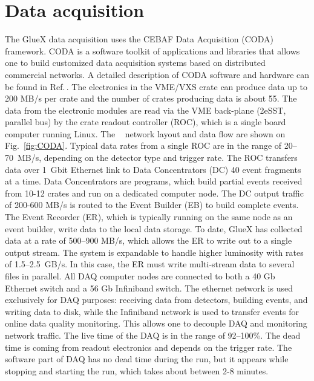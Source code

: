 
\section[Data Acquisition]{Data acquisition \label{sec:daq}}



The GlueX data acquisition uses the CEBAF Data Acquisition (CODA) framework. CODA is a software toolkit of applications and libraries that allows one to build customized data acquisition systems based on distributed commercial networks. A detailed description of CODA software and hardware can be found in Ref.\,\cite{CLAS12DAQ}. 
The electronics in the VME/VXS crate can produce data up to 200 MB/s per crate and the
number of crates producing data is about 55.
The data from the electronic modules are read via the VME back-plane (2eSST, parallel bus) by the crate readout controller (ROC), which is a single board computer running Linux.
The \gx~ network layout and data flow are shown on Fig.~\ref{fig:CODA}.
Typical data rates from a single ROC are in the range of 20--70~MB/s, depending on the detector type and trigger rate.
The ROC transfers data over 1~Gbit Ethernet link to Data Concentrators (DC) 40 event fragments at a time. Data Concentrators are programs, which build partial events received from 10-12 crates and run on a dedicated computer node.
The DC output traffic of 200-600 MB/s is routed to the Event Builder (EB) to build complete events.
The Event Recorder (ER), which is typically running on the same node as an event builder, write data to the local data storage.
To date, GlueX has collected data at a rate of 500--900 MB/s, which allows the ER to write out to a single output stream. The system is expandable to handle higher luminosity with rates of 1.5--2.5~GB/s. In this case, the ER must write multi-stream data to several files in parallel.
All DAQ computer nodes are connected to both a 40 Gb Ethernet switch and a 56 Gb Infiniband switch.
The ethernet network is used exclusively for DAQ purposes: receiving data from detectors, building events, and writing data to disk, 
while the Infiniband network is used to transfer events for online data quality monitoring. 
This allows one to decouple DAQ and monitoring network traffic.
The live time of the DAQ is in the range of 92--100\%. The dead time is coming from readout electronics and depends on the trigger rate.  
The software part of DAQ has no dead time during the run, but it appears while stopping and starting the run, which takes about between 2-8 minutes. 




